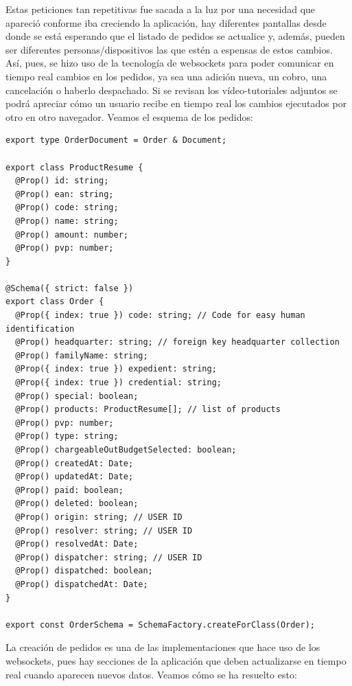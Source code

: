 \vspace{1em}
\par Estas peticiones tan repetitivas fue sacada a la luz por una necesidad que apareció conforme iba creciendo la aplicación, hay diferentes pantallas desde donde se está esperando que el listado de pedidos se actualice y, además, pueden ser diferentes personas/dispositivos las que estén a espensas de estos cambios. Así, pues, se hizo uso de la tecnología de websockets para poder comunicar en tiempo real cambios en los pedidos, ya sea una adición nueva, un cobro, una cancelación o haberlo despachado. Si se revisan los vídeo-tutoriales adjuntos se podrá apreciar cómo un usuario recibe en tiempo real los cambios ejecutados por otro en otro navegador.
\clearpage
Veamos el esquema de los pedidos:
\begin{lstlisting}[caption={Esquema de pedido},label=cod:ddbb-order-schema]
export type OrderDocument = Order & Document;

export class ProductResume {
  @Prop() id: string;
  @Prop() ean: string;
  @Prop() code: string;
  @Prop() name: string;
  @Prop() amount: number;
  @Prop() pvp: number;
}

@Schema({ strict: false })
export class Order {
  @Prop({ index: true }) code: string; // Code for easy human identification
  @Prop() headquarter: string; // foreign key headquarter collection
  @Prop() familyName: string;
  @Prop({ index: true }) expedient: string;
  @Prop({ index: true }) credential: string;
  @Prop() special: boolean;
  @Prop() products: ProductResume[]; // list of products
  @Prop() pvp: number;
  @Prop() type: string;
  @Prop() chargeableOutBudgetSelected: boolean;
  @Prop() createdAt: Date;
  @Prop() updatedAt: Date;
  @Prop() paid: boolean;
  @Prop() deleted: boolean;
  @Prop() origin: string; // USER ID
  @Prop() resolver: string; // USER ID
  @Prop() resolvedAt: Date;
  @Prop() dispatcher: string; // USER ID
  @Prop() dispatched: boolean;
  @Prop() dispatchedAt: Date;
}

export const OrderSchema = SchemaFactory.createForClass(Order);
\end{lstlisting}
\clearpage
\vspace{1em}
\par La creación de pedidos es una de las implementaciones que hace uso de los websockets, pues hay secciones de la aplicación que deben actualizarse en tiempo real cuando aparecen nuevos datos. Veamos cómo se ha resuelto esto:
